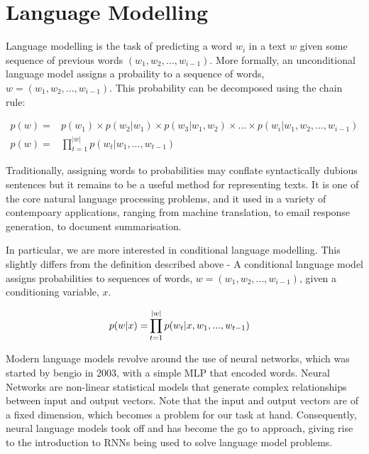 \documentclass[12pt,twoside]{report}
\begin{document}


\section{Language Modelling}


Language modelling is the task of predicting a word $w_i$ in a text $w$ given some sequence of previous words $(w_1, w_2, ..., w_{i-1})$. More formally, an unconditional language model assigns a probaility to a sequence of words,  $w = (w_1, w_2, ..., w_{i-1})$. This probability can be decomposed using the chain rule:

\begin{align}
p(w) = &{} p(w_1) \times p(w_2|w_1) \times p(w_3|w_1, w_2) \times ... \times p(w_i|w_1, w_2, ..., w_{i-1}) \\
p(w) = &{} \prod^{|w|}_{t=1}p(w_t|w_1, ..., w_{t-1})
\end{align}

Traditionally, assigning words to probabilities may conflate syntactically dubious sentences but it remains to be a useful method for representing texts. It is one of the core natural language processing problems, and it used in a variety of contempoary applications, ranging from machine translation, to email response generation, to document summarisation.

In particular, we are more interested in conditional language modelling. This slightly differs from the definition described above - A conditional language model assigns probabilities to sequences of words, $w = (w_1, w_2, ..., w_{i-1})$, given a conditioning variable, $x$. 


\begin{align}
	p(\boldmath{w}|x) = &{} \prod^{|w|}_{t=1}p(w_t|x,w_1, ..., w_{t-1})
\end{align}
	

Modern language models revolve around the use of neural networks, which was started by bengio in 2003, with a simple MLP that encoded words. Neural Networks are non-linear statistical models that generate complex relationships between input and output vectors. Note that the input and output vectors are of a fixed dimension, which becomes a problem for our task at hand.
Consequently, neural language models took off and has become the go to approach, giving rise to the introduction to RNNs being used to solve language model problems.
\end{document}
